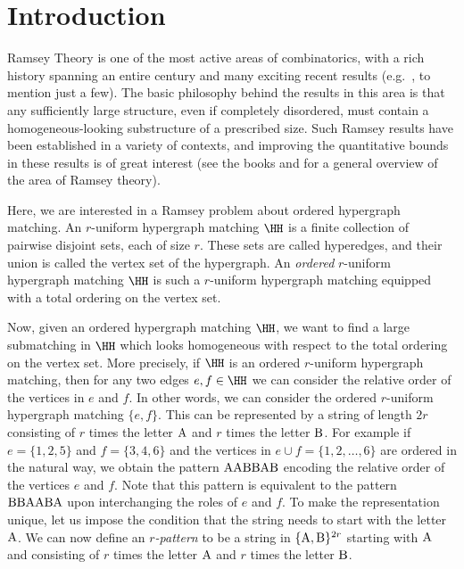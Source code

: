 \section{Introduction}

Ramsey Theory is one of the most active areas of combinatorics, with a rich history spanning an entire century and many exciting recent results (e.g.~\cite{Campos, Lee, MV, RR}, to mention just a few). The basic philosophy behind the results in this area is that any sufficiently large structure, even if completely disordered, must contain a homogeneous-looking substructure of a prescribed size. Such Ramsey results have been established in a variety of contexts, and improving the quantitative bounds in these results is of great interest (see the books \cite{graham-rothschild-spencer} and \cite{promel} for a general overview of the area of Ramsey theory).

Here, we are interested in a Ramsey problem about ordered hypergraph matching. An $r$-uniform hypergraph matching $\HH$ is a finite collection of pairwise disjoint sets, each of size $r$. These sets are called hyperedges, and their union is called the vertex set of the hypergraph. An \emph{ordered} $r$-uniform hypergraph matching $\HH$ is such a $r$-uniform hypergraph matching equipped with a total ordering on the vertex set.

Now, given an ordered hypergraph matching $\HH$, we want to find a large submatching in $\HH$ which looks homogeneous with respect to the total ordering on the vertex set.
More precisely, if $\HH$ is an ordered $r$-uniform hypergraph matching, then for any two edges $e,f\in\HH$ we can consider the relative order of the vertices in $e$ and $f$. In other words, we can consider the ordered $r$-uniform hypergraph matching $\{ e,f\}$. This can be represented by a string of length $2r$ consisting of $r$ times the letter $\rm A$ and $r$ times the letter $\rm B$. For example if $e=\{ 1,2,5\}$ and $f=\{ 3,4,6\}$ and the vertices in $e\cup f=\{1,2,\dots,6\}$ are ordered in the natural way, we obtain the pattern $\rm AABBAB$ encoding the relative order of the vertices $e$ and $f$. Note that this pattern is equivalent to the pattern $\rm BBAABA$ upon interchanging the roles of $e$ and $f$. To make the representation unique, let us impose the condition that the string needs to start with the letter $\rm A$. We can now define an \emph{$r$-pattern} to be a string in $\{{\rm A},{\rm B}\}^{2r}$ starting with $\rm A$ and consisting of $r$ times the letter $\rm A$ and $r$ times the letter $\rm B$.

